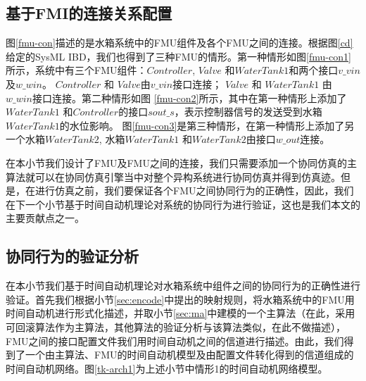 \subsection{基于FMI的连接关系配置} 
\label{sec:case}
图\ref{fmu-con}描述的是水箱系统中的FMU组件及各个FMU之间的连接。根据图\ref{cd}给定的SysML IBD，我们也得到了三种FMU的情形。第一种情形如图\ref{fmu-con1}所示，系统中有三个FMU组件：$Controller$, $Valve$ 和$WaterTank1$和两个接口$v \_ vin$及$w \_ win$。 $Controller$ 和 $Valve$由$v \_ vin$接口连接； $Valve$ 和 $WaterTank1$ 由 $w \_ win$接口连接。第二种情形如图 \ref{fmu-con2}所示，其中在第一种情形上添加了$WaterTank1$ 和$Controller$的接口$sout \_ s$，表示控制器信号的发送受到水箱$WaterTank1$的水位影响。 图\ref{fmu-con3}是第三种情形，在第一种情形上添加了另一个水箱$WaterTank2$, 水箱$WaterTank1$ 和$WaterTank2$由接口$w \_ out$连接。 
\begin{figure}[htbp]
\end{figure}

在本小节我们设计了FMU及FMU之间的连接，我们只需要添加一个协同仿真的主算法就可以在协同仿真引擎当中对整个异构系统进行协同仿真并得到仿真迹。但是，在进行仿真之前，我们要保证各个FMU之间协同行为的正确性，因此，我们在下一个小节基于时间自动机理论对系统的协同行为进行验证，这也是我们本文的主要贡献点之一。
\subsection{协同行为的验证分析} 
\label{sec:mauppaal}
在本小节我们基于时间自动机理论对水箱系统中组件之间的协同行为的正确性进行验证。首先我们根据小节\ref{sec:encode}中提出的映射规则，将水箱系统中的FMU用时间自动机进行形式化描述，并取小节\ref{sec:ma}中建模的一个主算法（在此，采用可回滚算法作为主算法，其他算法的验证分析与该算法类似，在此不做描述），FMU之间的接口配置文件我们用时间自动机之间的信道进行描述。由此，我们得到了一个由主算法、FMU的时间自动机模型及由配置文件转化得到的信道组成的时间自动机网络。图\ref{tk-arch1}为上述小节中情形1的时间自动机网络模型。

